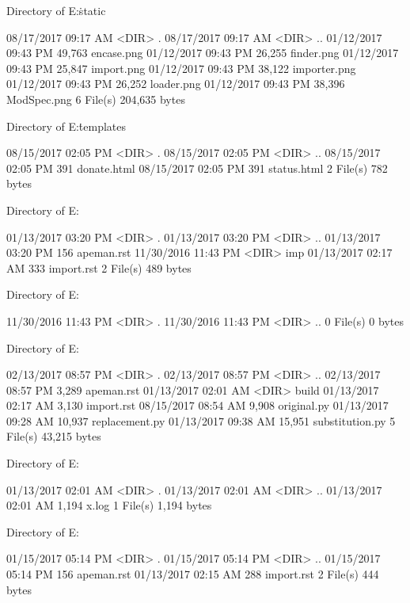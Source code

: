  Directory of E:\Python\apeman\docs\.static\figures\structure

08/17/2017  09:17 AM    <DIR>          .
08/17/2017  09:17 AM    <DIR>          ..
01/12/2017  09:43 PM            49,763 encase.png
01/12/2017  09:43 PM            26,255 finder.png
01/12/2017  09:43 PM            25,847 import.png
01/12/2017  09:43 PM            38,122 importer.png
01/12/2017  09:43 PM            26,252 loader.png
01/12/2017  09:43 PM            38,396 ModSpec.png
               6 File(s)        204,635 bytes

 Directory of E:\Python\apeman\docs\.templates

08/15/2017  02:05 PM    <DIR>          .
08/15/2017  02:05 PM    <DIR>          ..
08/15/2017  02:05 PM               391 donate.html
08/15/2017  02:05 PM               391 status.html
               2 File(s)            782 bytes

 Directory of E:\Python\apeman\docs{}

01/13/2017  03:20 PM    <DIR>          .
01/13/2017  03:20 PM    <DIR>          ..
01/13/2017  03:20 PM               156 apeman.rst
11/30/2016  11:43 PM    <DIR>          imp
01/13/2017  02:17 AM               333 import.rst
               2 File(s)            489 bytes

 Directory of E:\Python\apeman\docs{}\imp

11/30/2016  11:43 PM    <DIR>          .
11/30/2016  11:43 PM    <DIR>          ..
               0 File(s)              0 bytes

 Directory of E:\Python\apeman\docs{}

02/13/2017  08:57 PM    <DIR>          .
02/13/2017  08:57 PM    <DIR>          ..
02/13/2017  08:57 PM             3,289 apeman.rst
01/13/2017  02:01 AM    <DIR>          build
01/13/2017  02:17 AM             3,130 import.rst
08/15/2017  08:54 AM             9,908 original.py
01/13/2017  09:28 AM            10,937 replacement.py
01/13/2017  09:38 AM            15,951 substitution.py
               5 File(s)         43,215 bytes

 Directory of E:\Python\apeman\docs{}\build

01/13/2017  02:01 AM    <DIR>          .
01/13/2017  02:01 AM    <DIR>          ..
01/13/2017  02:01 AM             1,194 x.log
               1 File(s)          1,194 bytes

 Directory of E:\Python\apeman\docs{}

01/15/2017  05:14 PM    <DIR>          .
01/15/2017  05:14 PM    <DIR>          ..
01/15/2017  05:14 PM               156 apeman.rst
01/13/2017  02:15 AM               288 import.rst
               2 File(s)            444 bytes

